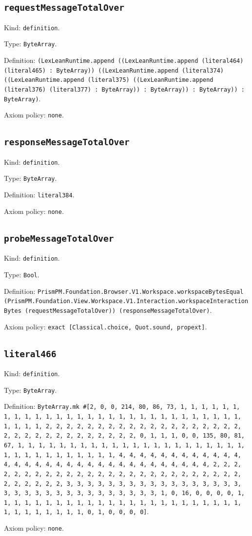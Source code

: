 \documentclass[11pt]{article}
\begin{document}
\subsection*{\texttt{requestMessageTotalOver}}
\noindent Kind: \texttt{definition}.\par
\noindent Type: \texttt{ByteArray}.\par
\noindent Definition: \texttt{(LexLeanRuntime.append ((LexLeanRuntime.append (literal464) (literal465) : ByteArray)) ((LexLeanRuntime.append (literal374) ((LexLeanRuntime.append (literal375) ((LexLeanRuntime.append (literal376) (literal377) : ByteArray)) : ByteArray)) : ByteArray)) : ByteArray)}.\par
\noindent Axiom policy: \texttt{none}.\par
\subsection*{\texttt{responseMessageTotalOver}}
\noindent Kind: \texttt{definition}.\par
\noindent Type: \texttt{ByteArray}.\par
\noindent Definition: \texttt{literal384}.\par
\noindent Axiom policy: \texttt{none}.\par
\subsection*{\texttt{probeMessageTotalOver}}
\noindent Kind: \texttt{definition}.\par
\noindent Type: \texttt{Bool}.\par
\noindent Definition: \texttt{PrismPM.Foundation.Browser.V1.Workspace.workspaceBytesEqual (PrismPM.Foundation.View.Workspace.V1.Interaction.workspaceInteractionBytes (requestMessageTotalOver)) (responseMessageTotalOver)}.\par
\noindent Axiom policy: \texttt{exact [Classical.choice, Quot.sound, propext]}.\par
\subsection*{\texttt{literal466}}
\noindent Kind: \texttt{definition}.\par
\noindent Type: \texttt{ByteArray}.\par
\noindent Definition: \texttt{ByteArray.mk \#[2, 0, 0, 214, 80, 86, 73, 1, 1, 1, 1, 1, 1, 1, 1, 1, 1, 1, 1, 1, 1, 1, 1, 1, 1, 1, 1, 1, 1, 1, 1, 1, 1, 1, 1, 1, 1, 1, 1, 1, 2, 2, 2, 2, 2, 2, 2, 2, 2, 2, 2, 2, 2, 2, 2, 2, 2, 2, 2, 2, 2, 2, 2, 2, 2, 2, 2, 2, 2, 2, 2, 2, 0, 1, 1, 1, 0, 0, 135, 80, 81, 67, 1, 1, 1, 1, 1, 1, 1, 1, 1, 1, 1, 1, 1, 1, 1, 1, 1, 1, 1, 1, 1, 1, 1, 1, 1, 1, 1, 1, 1, 1, 1, 1, 1, 4, 4, 4, 4, 4, 4, 4, 4, 4, 4, 4, 4, 4, 4, 4, 4, 4, 4, 4, 4, 4, 4, 4, 4, 4, 4, 4, 4, 4, 4, 4, 4, 2, 2, 2, 2, 2, 2, 2, 2, 2, 2, 2, 2, 2, 2, 2, 2, 2, 2, 2, 2, 2, 2, 2, 2, 2, 2, 2, 2, 2, 2, 2, 2, 3, 3, 3, 3, 3, 3, 3, 3, 3, 3, 3, 3, 3, 3, 3, 3, 3, 3, 3, 3, 3, 3, 3, 3, 3, 3, 3, 3, 3, 3, 3, 3, 1, 0, 16, 0, 0, 0, 0, 1, 1, 1, 1, 1, 1, 1, 1, 1, 1, 1, 1, 1, 1, 1, 1, 1, 1, 1, 1, 1, 1, 1, 1, 1, 1, 1, 1, 1, 1, 1, 1, 0, 1, 0, 0, 0, 0]}.\par
\noindent Axiom policy: \texttt{none}.\par
\end{document}
